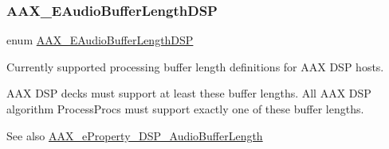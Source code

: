 \subsubsection{\texorpdfstring{AAX\_EAudioBufferLengthDSP}{AAX\_EAudioBufferLengthDSP}}
{\footnotesize\ttfamily enum \mbox{\hyperlink{a00491_ab33e0f1ecf04ca4161fa8d8de5845d67}{A\+A\+X\+\_\+\+E\+Audio\+Buffer\+Length\+D\+SP}}}



Currently supported processing buffer length definitions for A\+AX D\+SP hosts. 

A\+AX D\+SP decks must support at least these buffer lengths. All A\+AX D\+SP algorithm Process\+Procs must support exactly one of these buffer lengths.

\begin{DoxySeeAlso}{See also}
\mbox{\hyperlink{a00662_a13e384f22825afd3db6d68395b79ce0da09fbd1cbcae0e86ad81005258dc1b67e}{A\+A\+X\+\_\+e\+Property\+\_\+\+D\+S\+P\+\_\+\+Audio\+Buffer\+Length}} 
\end{DoxySeeAlso}
